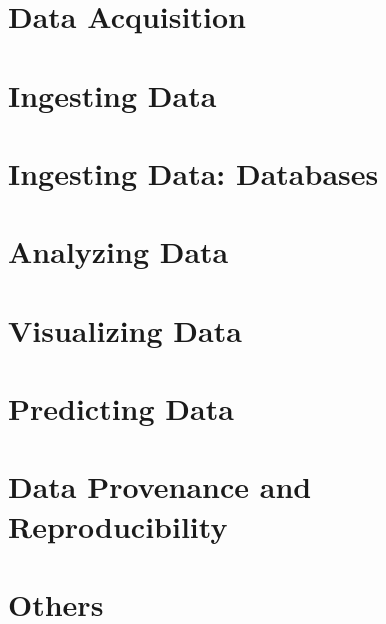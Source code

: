 \chapter{Data Acquisition}





\chapter{Ingesting Data}



\chapter{Ingesting Data: Databases}





\chapter{Analyzing Data}



\chapter{Visualizing Data}





\chapter{Predicting Data}



\chapter{Data Provenance and Reproducibility}




\chapter{Others}







